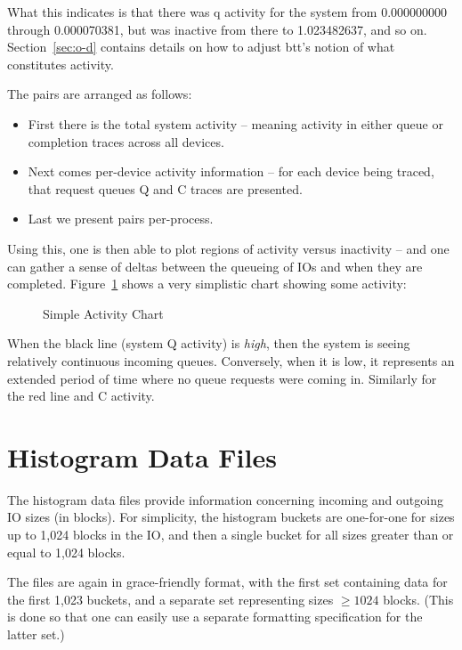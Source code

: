 \documentclass{article}
\begin{document}
  What this indicates is that there was q activity for the system
  from 0.000000000 through 0.000070381, but was inactive from there to
  1.023482637, and so on. Section~\ref{sec:o-d} contains details on how
  to adjust btt's notion of what constitutes activity.

  The pairs are arranged as follows:

  \begin{itemize}
    \item First there is the total system activity -- meaning activity
    in either queue or completion traces across all devices.

    \item Next comes per-device activity information -- for each device
    being traced, that request queues Q and C traces are presented.

    \item Last we present pairs per-process.
  \end{itemize}

  Using this, one is then able to plot regions of activity versus
  inactivity -- and one can gather a sense of deltas between the queueing
  of IOs and when they are completed. Figure~\ref{fig:activity} shows
  a very simplistic chart showing some activity:

  \begin{figure}[hb]
  \leavevmode\centering
  \caption{\label{fig:activity}Simple Activity Chart}
  \end{figure}

  When the black line (system Q activity) is \emph{high}, then the system
  is seeing relatively continuous incoming queues. Conversely, when it is
  low, it represents an extended period of time where no queue requests
  were coming in. Similarly for the red line and C activity.

\newpage\section{\label{sec:hist}Histogram Data Files}

  The histogram data files provide information concerning incoming and
  outgoing IO sizes (in blocks). For simplicity, the histogram buckets
  are one-for-one for sizes up to 1,024 blocks in the IO, and then a
  single bucket for all sizes greater than or equal to 1,024 blocks.

  The files are again in grace-friendly format, with the first set
  containing data for the first 1,023 buckets, and a separate set
  representing sizes $\ge 1024$ blocks. (This is done so that one can
  easily use a separate formatting specification for the latter set.)
\end{document}
